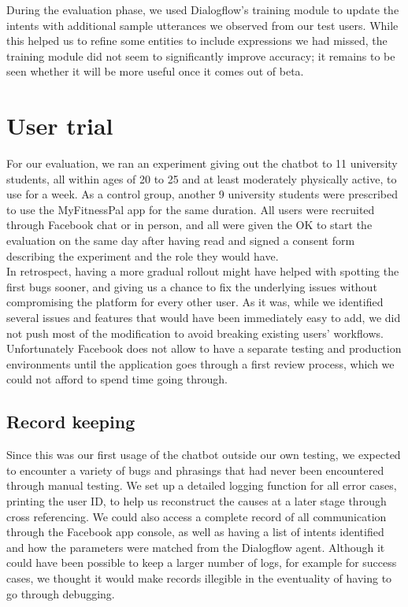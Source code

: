 During the evaluation phase, we used Dialogflow's training module to update the intents with additional sample utterances we observed from our test users. While this helped us to refine some entities to include expressions we had missed, the training module did not seem to significantly improve accuracy; it remains to be seen whether it will be more useful once it comes out of beta.
\section{User trial}
For our evaluation, we ran an experiment giving out the chatbot to 11 university students, all within ages of 20 to 25 and at least moderately physically active, to use for a week. As a control group, another 9 university students were prescribed to use the MyFitnessPal app for the same duration. All users were recruited through Facebook chat or in person, and all were given the OK to start the evaluation on the same day after having read and signed a consent form describing the experiment and the role they would have. \\
In retrospect, having a more gradual rollout might have helped with spotting the first bugs sooner, and giving us a chance to fix the underlying issues without compromising the platform for every other user. As it was, while we identified several issues and features that would have been immediately easy to add, we did not push most of the modification to avoid breaking existing users' workflows. Unfortunately Facebook does not allow to have a separate testing and production environments until the application goes through a first review process, which we could not afford to spend time going through.
\subsection{Record keeping}
Since this was our first usage of the chatbot outside our own testing, we expected to encounter a variety of bugs and phrasings that had never been encountered through manual testing. We set up a detailed logging function for all error cases, printing the user ID, to help us reconstruct the causes at a later stage through cross referencing. We could also access a complete record of all communication through the Facebook app console, as well as having a list of intents identified and how the parameters were matched from the Dialogflow agent. Although it could have been possible to keep a larger number of logs, for example for success cases, we thought it would make records illegible in the eventuality of having to go through debugging.

